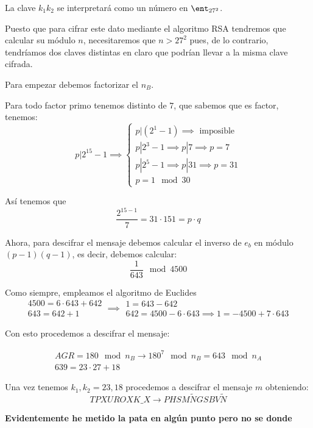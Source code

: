 \begin{problem}[5]

\spart

La clave $k_1k_2$ se interpretará como un número en $\ent_{27^2}$.

Puesto que para cifrar este dato mediante el algoritmo RSA tendremos que calcular su módulo $n$, necesitaremos que $n>27^2$ pues, de lo contrario, tendríamos dos claves distintas en claro que podrían llevar a la misma clave cifrada.

\spart

Para empezar debemos factorizar el $n_B$.

Para todo factor primo tenemos distinto de $7$, que sabemos que es factor, tenemos:
\[p|2^{15}-1 \implies \left\{ \begin{array}{l}
p|(2^1-1)\implies \text{ imposible}\\
p|2^3-1 \implies p|7 \implies p=7\\
p|2^5-1 \implies p |31 \implies  p=31\\
p =1 \mod 30 \end{array}\right.\]

Así tenemos que
\[\frac{2^{15-1}}{7} = 31\cdot 151 = p\cdot q\]

Ahora, para descifrar el mensaje debemos calcular el inverso de $e_b$ en módulo $(p-1)(q-1)$, es decir, debemos calcular:
\[\frac{1}{643} \mod 4500\]

Como siempre, empleamos el algoritmo de Euclides
\[
\begin{array}{l}
4500 = 6 \cdot 643 + 642\\
643 = 642 + 1
\end{array} \implies \begin{array}{l}
1 = 643 - 642 \\
642 = 4500 - 6 \cdot 643 \implies 1 = -4500 + 7\cdot 643
\end{array}
\]

Con esto procedemos a descifrar el mensaje:

\[\begin{array}{l}
AGR = 180 \mod n_B \to 180^{7} \mod n_B = 643 \mod n_A \\
639 = 23 \cdot 27 + 18
\end{array}\]

Una vez tenemos $k_1,k_2=23,18$ procedemos a descifrar el mensaje $m$ obteniendo:
\[TPXUROXK\_X \to PHSM\tilde{N}GSBV\tilde{N}\]

\textbf{Evidentemente he metido la pata en algún punto pero no se donde}

\spart


\end{problem}
